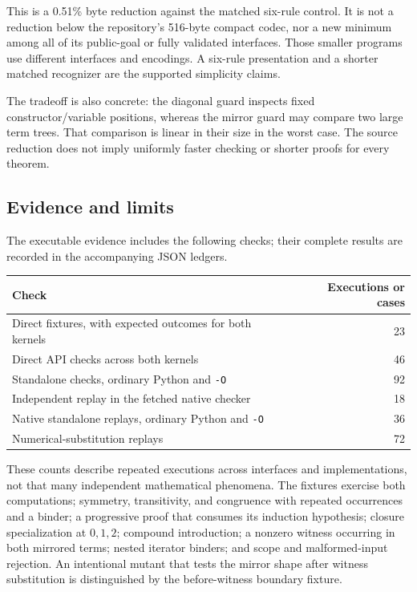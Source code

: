 \documentclass[11pt]{article}
\theoremstyle{definition}\newtheorem{definition}[theorem]{Definition}
\begin{document}
This is a 0.51\% byte reduction against the matched six-rule control.
It is not a reduction below the repository's 516-byte compact codec,
nor a new minimum among all of its public-goal or fully validated
interfaces. Those smaller programs use different interfaces and
encodings. A six-rule presentation and a shorter matched recognizer
are the supported simplicity claims.

The tradeoff is also concrete: the diagonal guard inspects fixed
constructor/variable positions, whereas the mirror guard may compare
two large term trees. That comparison is linear in their size in the
worst case. The source reduction does not imply uniformly faster
checking or shorter proofs for every theorem.

\subsection{Evidence and limits}
The executable evidence includes the following checks; their complete
results are recorded in the accompanying JSON ledgers.
\begin{center}
\begin{tabular}{lr}
\toprule
Check & Executions or cases\\
\midrule
Direct fixtures, with expected outcomes for both kernels & 23\\
Direct API checks across both kernels & 46\\
Standalone checks, ordinary Python and \texttt{-O} & 92\\
Independent replay in the fetched native checker & 18\\
Native standalone replays, ordinary Python and \texttt{-O} & 36\\
Numerical-substitution replays & 72\\
\bottomrule
\end{tabular}
\end{center}
These counts describe repeated executions across interfaces and
implementations, not that many independent mathematical phenomena.
The fixtures exercise both computations; symmetry, transitivity, and
congruence with repeated occurrences and a binder; a progressive proof
that consumes its induction hypothesis; closure specialization at
$0,1,2$; compound introduction; a nonzero witness occurring in both
mirrored terms; nested iterator binders; and scope and malformed-input rejection.
An intentional mutant that tests the mirror shape after witness
substitution is distinguished by the before-witness boundary fixture.
\end{document}
